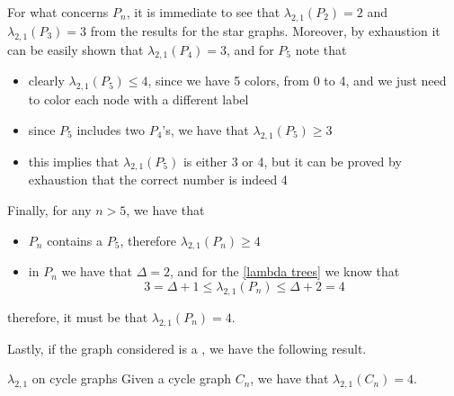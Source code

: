 \documentclass[a4paper, 12pt]{report}
\begin{document}
    For what concerns  $P_n$, it is immediate to see that $\lambda_{2,1}(P_2) = 2$ and $\lambda_{2,1}(P_3) = 3$ from the results for the star graphs. Moreover, by exhaustion it can be easily shown that $\lambda_{2,1}(P_4) = 3$, and for $P_5$ note that

    \begin{itemize}
        \item clearly $\lambda_{2,1}(P_5) \le 4$, since we have 5 colors, from 0 to 4, and we just need to color each node with a different label
        \item since $P_5$ includes two $P_4$'s, we have that $\lambda_{2,1}(P_5) \ge 3$
        \item this implies that $\lambda_{2,1}(P_5)$ is either 3 or 4, but it can be proved by exhaustion that the correct number is indeed 4
    \end{itemize}

    Finally, for any $n > 5$, we have that

    \begin{itemize}
        \item $P_n$ contains a $P_5$, therefore $\lambda_{2,1}(P_n) \ge 4$
        \item in $P_n$ we have that $\Delta = 2$, and for the \cref{lambda trees} we know that $$3 = \Delta + 1 \le \lambda_{2,1}(P_n) \le \Delta + 2 = 4$$
    \end{itemize}

    therefore, it must be that $\lambda_{2,1}(P_n) = 4$.

    Lastly, if the graph considered is a , we have the following result.

    \begin{framedthm}{$\lambda_{2,1}$ on cycle graphs}
        Given a cycle graph $C_n$, we have that $\lambda_{2,1}(C_n) = 4$.
    \end{framedthm}
\end{document}
